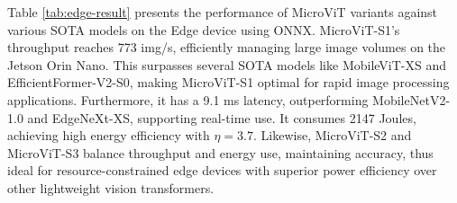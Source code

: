 Table \ref{tab:edge-result} presents the performance of MicroViT variants against various SOTA models on the Edge device using ONNX. MicroViT-S1's throughput reaches 773 img/s, efficiently managing large image volumes on the Jetson Orin Nano. This surpasses several SOTA models like MobileViT-XS\cite{mehta2021mobilevit} and EfficientFormer-V2-S0\cite{li2023rethinking}, making MicroViT-S1 optimal for rapid image processing applications. Furthermore, it has a 9.1 ms latency, outperforming MobileNetV2-1.0\cite{sandler2018mobilenetv2} and EdgeNeXt-XS\cite{maaz2022edgenext}, supporting real-time use. It consumes 2147 Joules, achieving high energy efficiency with $\eta=3.7$. Likewise, MicroViT-S2 and MicroViT-S3 balance throughput and energy use, maintaining accuracy, thus ideal for resource-constrained edge devices with superior power efficiency over other lightweight vision transformers.
